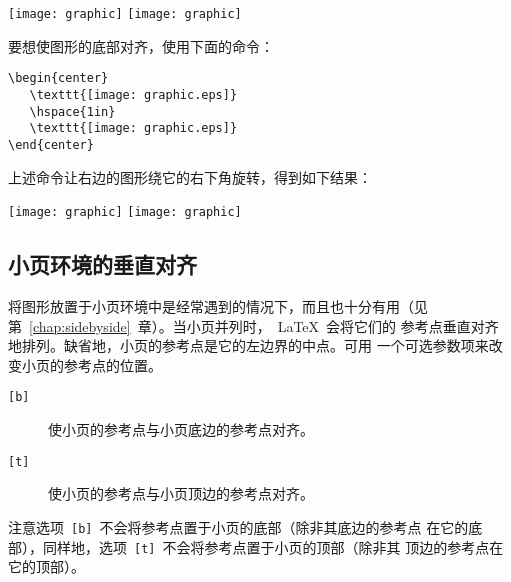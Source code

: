 \begin{center}
   \texttt{[image: graphic]}
   \hspace{1in}
   \texttt{[image: graphic]}
\end{center}
要想使图形的底部对齐，使用下面的命令：

\begin{Verbatim}[xleftmargin=1cm]
\begin{center}
   \texttt{[image: graphic.eps]}
   \hspace{1in}
   \texttt{[image: graphic.eps]}
\end{center}
\end{Verbatim}
上述命令让右边的图形绕它的右下角旋转，得到如下结果：

\begin{center}
   \texttt{[image: graphic]}
   \hspace{1in}
   \texttt{[image: graphic]}
\end{center}

\subsection{小页环境的垂直对齐}\label{ssec:minivalign}

将图形放置于小页环境中是经常遇到的情况下，而且也十分有用（见
第~\ref{chap:sidebyside}~章）。当小页并列时，~\LaTeX{}~会将它们的
参考点垂直对齐地排列。缺省地，小页的参考点是它的左边界的中点。可用
一个可选参数项来改变小页的参考点的位置。

\begin{description}
\item[\texttt{[b]}] 使小页的参考点与小页底边的参考点对齐。
\item[\texttt{[t]}] 使小页的参考点与小页顶边的参考点对齐。
\end{description}

注意选项~\texttt{[b]}~不会将参考点置于小页的底部（除非其底边的参考点
在它的底部），同样地，选项~\texttt{[t]}~不会将参考点置于小页的顶部（除非其
顶边的参考点在它的顶部）。

